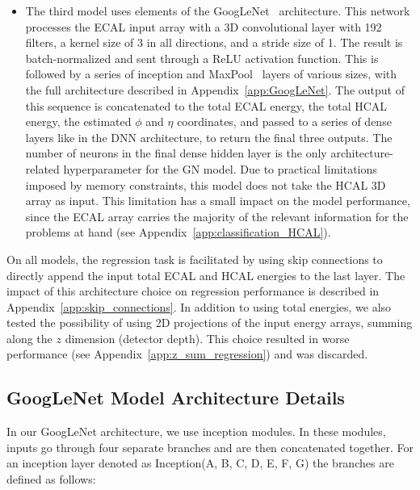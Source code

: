 \begin{itemize}
    \item The third model uses elements of the GoogLeNet~\cite{GoogLeNet} architecture. This network processes the ECAL input array with a 3D convolutional layer with 192 filters, a kernel size of 3 in all directions, and a stride size of 1. The result is batch-normalized and sent through a ReLU activation function. This is followed by a series of inception and MaxPool~\cite{conv} layers of various sizes, with the full architecture described in Appendix~\ref{app:GoogLeNet}. The output of this sequence is concatenated to the total ECAL energy, the total HCAL energy, the estimated $\phi$ and $\eta$ coordinates, and passed to a series of dense layers like in the DNN architecture, to return the final three outputs. The number of neurons in the final dense hidden layer is the only architecture-related hyperparameter for the GN model. Due to practical limitations imposed by memory constraints, this model does not take the HCAL 3D array as input. This limitation has a small impact on the model performance, since the ECAL array carries the majority of the relevant information for the problems at hand (see Appendix~\ref{app:classification_HCAL}).
\end{itemize}

On all models, the regression task is facilitated by using skip connections to directly append the input total ECAL and HCAL energies to the last layer. The impact of this architecture choice on regression performance is described in Appendix~\ref{app:skip_connections}. In addition to using total energies, we also tested the possibility of using 2D projections of the input energy arrays, summing along the $z$ dimension (detector depth). This choice resulted in worse performance (see Appendix~\ref{app:z_sum_regression}) and was discarded.

\subsection*{GoogLeNet Model Architecture Details}\label{app:GoogLeNet}

In our GoogLeNet architecture, we use inception modules. In these modules, inputs go through four separate branches and are then concatenated together. For an inception layer denoted as Inception(A, B, C, D, E, F, G) the branches are defined as follows:

